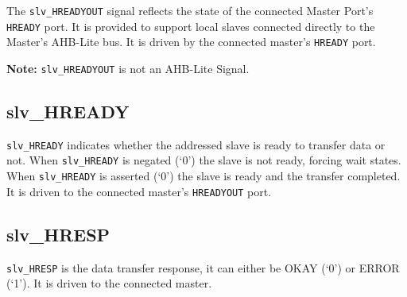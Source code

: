 The \texttt{slv\_HREADYOUT} signal reflects the state of the connected Master
Port's \texttt{HREADY} port. It is provided to support local slaves connected
directly to the Master's AHB-Lite bus. It is driven by the connected
master's \texttt{HREADY} port.

\textbf{Note:} \texttt{slv\_HREADYOUT} is not an AHB-Lite Signal.

\subsection{slv\_HREADY}\label{slv_hready}

\texttt{slv\_HREADY} indicates whether the addressed slave is ready to transfer
data or not. When \texttt{slv\_HREADY} is negated (`0') the slave is not ready,
forcing wait states. When \texttt{slv\_HREADY} is asserted (`0') the slave is
ready and the transfer completed. It is driven to the connected master's
\texttt{HREADYOUT} port.

\subsection{slv\_HRESP}\label{slv_hresp}

\texttt{slv\_HRESP} is the data transfer response, it can either be OKAY (`0') or
ERROR (`1'). It is driven to the connected master.
